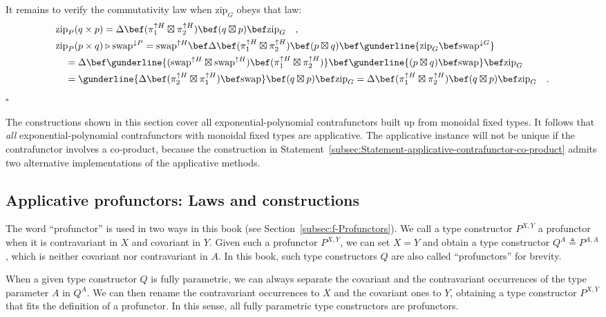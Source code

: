 It remains to verify the commutativity law when $\text{zip}_{G}$
obeys that law:
\begin{align*}
 & \text{zip}_{P}(q\times p)=\Delta\bef(\pi_{1}^{\uparrow H}\boxtimes\pi_{2}^{\uparrow H})\bef(q\boxtimes p)\bef\text{zip}_{G}\quad,\\
 & \text{zip}_{P}(p\times q)\triangleright\text{swap}^{\downarrow P}=\text{swap}^{\uparrow H}\bef\Delta\bef(\pi_{1}^{\uparrow H}\boxtimes\pi_{2}^{\uparrow H})\bef(p\boxtimes q)\bef\gunderline{\text{zip}_{G}\bef\text{swap}^{\downarrow G}}\\
 & \quad=\Delta\bef\gunderline{(\text{swap}^{\uparrow H}\boxtimes\text{swap}^{\uparrow H})\bef(\pi_{1}^{\uparrow H}\boxtimes\pi_{2}^{\uparrow H})}\bef\gunderline{(p\boxtimes q)\bef\text{swap}}\bef\text{zip}_{G}\\
 & \quad=\gunderline{\Delta\bef(\pi_{2}^{\uparrow H}\boxtimes\pi_{1}^{\uparrow H})\bef\text{swap}}\bef(q\boxtimes p)\bef\text{zip}_{G}=\Delta\bef(\pi_{1}^{\uparrow H}\boxtimes\pi_{2}^{\uparrow H})\bef(q\boxtimes p)\bef\text{zip}_{G}\quad.
\end{align*}
$\square$

The constructions shown in this section cover all exponential-polynomial
contrafunctors built up from monoidal fixed types. It follows that
\emph{all} exponential-polynomial contrafunctors with monoidal fixed
types are applicative. The applicative instance will not be unique
if the contrafunctor involves a co-product, because the construction
in Statement~\ref{subsec:Statement-applicative-contrafunctor-co-product}
admits two alternative implementations of the applicative methods.

\subsection{Applicative profunctors: Laws and constructions}

The word \textsf{``}profunctor\textsf{''} is used in two ways in
this book (see Section~\ref{subsec:f-Profunctors}). We call a type
constructor $P^{X,Y}$ a profunctor when it is contravariant in $X$
and covariant in $Y$. Given such a profunctor $P^{X,Y}$, we can
set $X=Y$ and obtain a type constructor $Q^{A}\triangleq P^{A,A}$,
which is neither covariant nor contravariant in $A$. In this book,
such type constructors $Q$ are also called \textsf{``}profunctors\textsf{''} for
brevity. 

When a given type constructor $Q$ is fully parametric, we can always
separate the covariant and the contravariant occurrences of the type
parameter $A$ in $Q^{A}$. We can then rename the contravariant occurrences
to $X$ and the covariant ones to $Y$, obtaining a type constructor
$P^{X,Y}$ that fits the definition of a profunctor. In this sense,
all fully parametric type constructors are profunctors.

